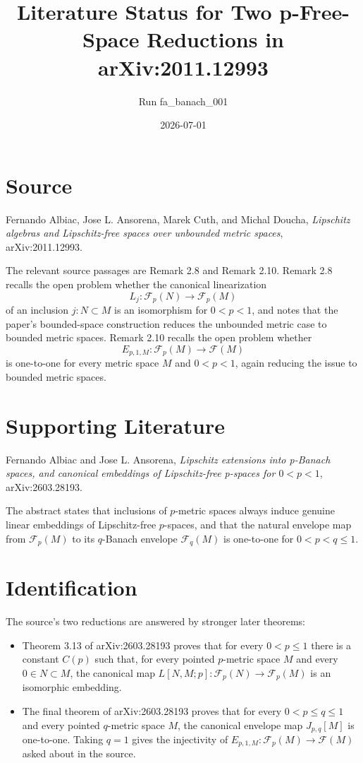 \documentclass[11pt]{article}
\title{Literature Status for Two p-Free-Space Reductions in arXiv:2011.12993}
\author{Run fa\_banach\_001}
\date{2026-07-01}
\begin{document}
\maketitle

\section*{Source}

Fernando Albiac, Jose L. Ansorena, Marek Cuth, and Michal Doucha,
\emph{Lipschitz algebras and Lipschitz-free spaces over unbounded metric spaces},
arXiv:2011.12993.

The relevant source passages are Remark 2.8 and Remark 2.10. Remark 2.8 recalls
the open problem whether the canonical linearization
\[
L_j:\mathcal F_p(N)\longrightarrow \mathcal F_p(M)
\]
of an inclusion $j:N\subset M$ is an isomorphism for $0<p<1$, and notes that the
paper's bounded-space construction reduces the unbounded metric case to bounded
metric spaces. Remark 2.10 recalls the open problem whether
\[
E_{p,1,M}:\mathcal F_p(M)\longrightarrow \mathcal F(M)
\]
is one-to-one for every metric space $M$ and $0<p<1$, again reducing the issue to
bounded metric spaces.

\section*{Supporting Literature}

Fernando Albiac and Jose L. Ansorena,
\emph{Lipschitz extensions into p-Banach spaces, and canonical embeddings of
Lipschitz-free p-spaces for $0<p<1$}, arXiv:2603.28193.

The abstract states that inclusions of $p$-metric spaces always induce genuine
linear embeddings of Lipschitz-free $p$-spaces, and that the natural envelope map
from $\mathcal F_p(M)$ to its $q$-Banach envelope $\mathcal F_q(M)$ is one-to-one
for $0<p<q\le 1$.

\section*{Identification}

The source's two reductions are answered by stronger later theorems:

\begin{itemize}
\item Theorem 3.13 of arXiv:2603.28193 proves that for every $0<p\le 1$ there is
a constant $C(p)$ such that, for every pointed $p$-metric space $M$ and every
$0\in N\subset M$, the canonical map
$L[N,M;p]:\mathcal F_p(N)\to\mathcal F_p(M)$ is an isomorphic embedding.

\item The final theorem of arXiv:2603.28193 proves that for every
$0<p\le q\le 1$ and every pointed $q$-metric space $M$, the canonical envelope map
$J_{p,q}[M]$ is one-to-one. Taking $q=1$ gives the injectivity of
$E_{p,1,M}:\mathcal F_p(M)\to\mathcal F(M)$ asked about in the source.
\end{itemize}
\end{document}
